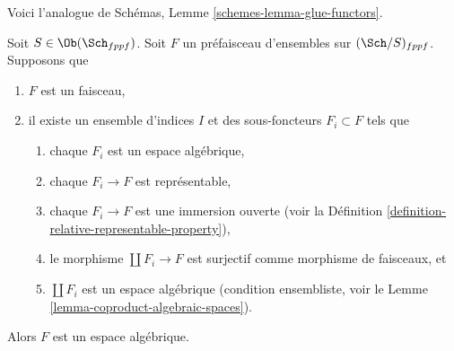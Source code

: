 \noindent
Voici l'analogue de Schémas, Lemme \ref{schemes-lemma-glue-functors}.

\begin{lemma}
\label{lemma-glueing-algebraic-spaces}
Soit $S \in \Ob(\Sch_{fppf})$.
Soit $F$ un préfaisceau d'ensembles sur $(\Sch/S)_{fppf}$.
Supposons que
\begin{enumerate}
\item $F$ est un faisceau,
\item il existe un ensemble d'indices $I$
et des sous-foncteurs $F_i \subset F$ tels que
\begin{enumerate}
\item chaque $F_i$ est un espace algébrique,
\item chaque $F_i \to F$ est représentable,
\item chaque $F_i \to F$ est une immersion ouverte (voir la
Définition \ref{definition-relative-representable-property}),
\item le morphisme $\coprod F_i \to F$ est surjectif comme morphisme de faisceaux, et
\item $\coprod F_i$ est un espace algébrique (condition ensembliste, voir le
Lemme \ref{lemma-coproduct-algebraic-spaces}).
\end{enumerate}
\end{enumerate}
Alors $F$ est un espace algébrique.
\end{lemma}

